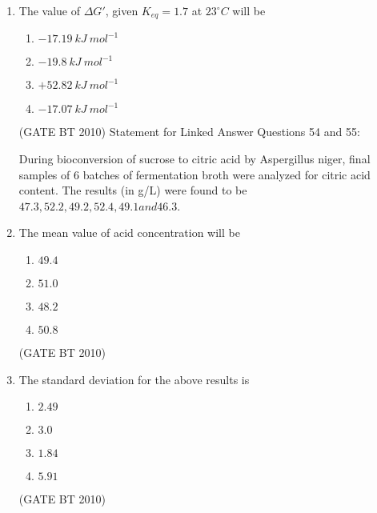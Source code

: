 \documentclass[journal,12pt,onecolumn]{IEEEtran}
\theoremstyle{remark}
\begin{document}
\begin{enumerate}
\item The value of $\Delta G'$, given $K_{eq}=1.7$ at $23^{\circ}C$ will be
\begin{enumerate}
  \item $-17.19\ kJ\ mol^{-1}$
  \item $-19.8\ kJ\ mol^{-1}$
  \item $+52.82\ kJ\ mol^{-1}$
  \item $-17.07\ kJ\ mol^{-1}$
\end{enumerate}
\hfill (GATE BT 2010)
Statement for Linked Answer Questions 54 and 55:

During bioconversion of sucrose to citric acid by Aspergillus niger, final samples of 6 batches of fermentation broth were analyzed for citric acid content. The results (in g/L) were found to be $47.3, 52.2, 49.2, 52.4, 49.1 and 46.3$.


\item
The mean value of acid concentration will be
\begin{enumerate}
   \item $49.4$
   \item $51.0$
   \item $48.2$
   \item $50.8$
\end{enumerate}
\hfill (GATE BT 2010)

\item
The standard deviation for the above results is
\begin{enumerate}
\item $2.49$
\item $3.0$
\item $1.84$
\item $5.91$
\end{enumerate}
\hfill (GATE BT 2010)
\end{enumerate}
\end{document}
